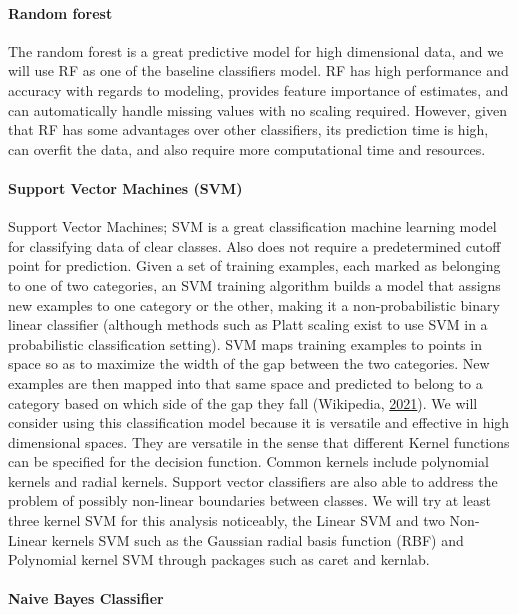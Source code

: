 \documentclass[
  10pt,
]{article}
\begin{document}
\paragraph{Random forest}

The random forest is a great predictive model for high dimensional data, and we will use RF as one of the baseline classifiers model. RF has high performance and accuracy with regards to modeling, provides feature importance of estimates, and can automatically handle missing values with no scaling required. However, given that RF has some advantages over other classifiers, its prediction time is high, can overfit the data, and also require more computational time and resources.

\hypertarget{support-vector-machines-svm}{%
\paragraph{Support Vector Machines (SVM)}\label{support-vector-machines-svm}}

Support Vector Machines; SVM is a great classification machine learning model for classifying data of clear classes. Also does not require a predetermined cutoff point for prediction. Given a set of training examples, each marked as belonging to one of two categories, an SVM training algorithm builds a model that assigns new examples to one category or the other, making it a non-probabilistic binary linear classifier (although methods such as Platt scaling exist to use SVM in a probabilistic classification setting). SVM maps training examples to points in space so as to maximize the width of the gap between the two categories. New examples are then mapped into that same space and predicted to belong to a category based on which side of the gap they fall (Wikipedia, \protect\hyperlink{ref-wikipedia}{2021}).
We will consider using this classification model because it is versatile and effective in high dimensional spaces. They are versatile in the sense that different Kernel functions can be specified for the decision function. Common kernels include polynomial kernels and radial kernels. Support vector classifiers are also able to address the problem of possibly non-linear boundaries between classes. We will try at least three kernel SVM for this analysis noticeably, the Linear SVM and two Non-Linear kernels SVM such as the Gaussian radial basis function (RBF) and Polynomial kernel SVM through packages such as caret and kernlab.

\hypertarget{naive-bayes-classifier}{%
\paragraph{Naive Bayes Classifier}\label{naive-bayes-classifier}}
\end{document}
